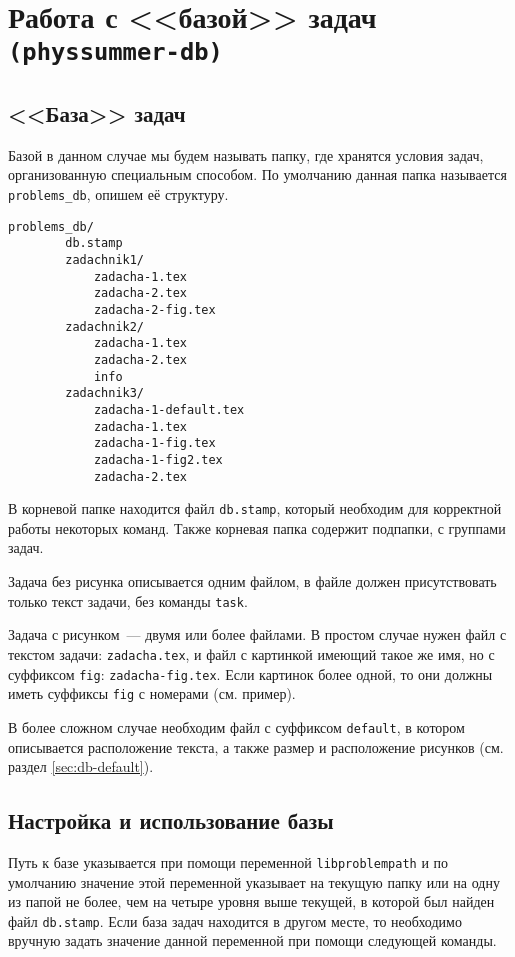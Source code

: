\section{Работа с <<базой>> задач \texttt{(physsummer-db)}}
\label{sec:db}

\subsection{<<База>> задач}
\label{sec:db-description}

Базой в данном случае мы будем называть папку, где хранятся условия задач, организованную специальным
способом. По умолчанию данная папка называется \texttt{problems\_db}, опишем её структуру.

\begin{lstlisting}[gobble = 3]
    problems_db/
        db.stamp
        zadachnik1/
            zadacha-1.tex
            zadacha-2.tex
            zadacha-2-fig.tex
        zadachnik2/
            zadacha-1.tex
            zadacha-2.tex
            info
        zadachnik3/
            zadacha-1-default.tex
            zadacha-1.tex
            zadacha-1-fig.tex
            zadacha-1-fig2.tex
            zadacha-2.tex
\end{lstlisting}

В корневой папке находится файл \texttt{db.stamp}, который необходим для корректной работы некоторых
команд. Также корневая папка содержит подпапки, с группами задач.

Задача без рисунка описывается одним файлом, в файле должен присутствовать только текст задачи, без
команды \texttt{task}.

Задача с рисунком~--- двумя или более файлами. В простом случае нужен файл с текстом задачи:
\texttt{zadacha.tex}, и файл с картинкой имеющий такое же имя, но с суффиксом \texttt{fig}:
\texttt{zadacha-fig.tex}. Если картинок более одной, то они должны иметь суффиксы \texttt{fig} с номерами
(см. пример).

В более сложном случае необходим файл с суффиксом \texttt{default}, в котором описывается расположение
текста, а также размер и расположение рисунков (см. раздел \ref{sec:db-default}).

\subsection{Настройка и использование базы}

Путь к базе указывается при помощи переменной \texttt{libproblempath} и по умолчанию значение этой
переменной указывает на текущую папку или на одну из папой не более, чем на четыре уровня выше текущей, в
которой был найден файл \texttt{db.stamp}. Если база задач находится в другом месте, то необходимо
вручную задать значение данной переменной при помощи следующей команды.

